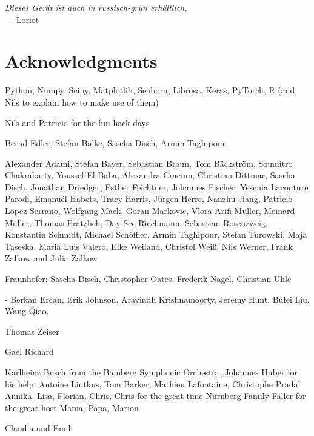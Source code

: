 
\begin{flushright}{\slshape
    Dieses Gerät ist auch in russisch-grün erhältlich.
    }\\ \medskip
    --- Loriot
\end{flushright}



\bigskip

\begingroup
\let\clearpage\relax
\let\cleardoublepage\relax
\let\cleardoublepage\relax
\chapter*{Acknowledgments}

Python, Numpy, Scipy, Matplotlib, Seaborn, Librosa, Keras, PyTorch, R (and Nils to explain how to make use of them)

Nils and Patricio for the fun hack days

Bernd Edler, Stefan Balke, Sascha Disch, Armin Taghipour

Alexander Adami, Stefan Bayer, Sebastian Braun, Tom Bäckström, Soumitro Chakrabarty, 
Youssef El Baba, Alexandra Craciun, Christian Dittmar, Sascha Disch, Jonathan Driedger, Esther Feichtner, Johannes Fischer, 
Yesenia Lacouture Parodi, Emanuël Habets, Tracy Harris, Jürgen Herre, Nanzhu Jiang, 
Patricio Lopez-Serrano, Wolfgang Mack, Goran Markovic, Vlora Arifi Müller, Meinard Müller, Thomas Prätzlich, 
Day-See Riechmann, Sebastian Rosenzweig, Konstantin Schmidt, Michael Schöffler, Armin Taghipour, 
Stefan Turowski, Maja Taseska, Maria Luis Valero, Elke Weiland, Christof Weiß, Nils Werner, 
Frank Zalkow and Julia Zalkow

Fraunhofer: Sascha Disch, Christopher Oates, Frederik Nagel, Christian Uhle

- Berkan Ercan, Erik Johnson, Aravindh Krishnamoorty, Jeremy Hunt, Bufei Liu, Wang Qiao, 

Thomas Zeiser



Gael Richard
\bigskip

\bigskip
Karlheinz Busch from the Bamberg Symphonic Orchestra, Johannes Huber for his help.
\bigskip
Antoine Liutkus, Tom Barker, Mathieu Lafontaine, Christophe Pradal
\bigskip
Annika, Lisa, Florian, Chris, Chris for the great time Nürnberg
\bigskip
Family Faller for the great host
Mama, Papa, Marion

\bigskip

Claudia and Emil

\endgroup
